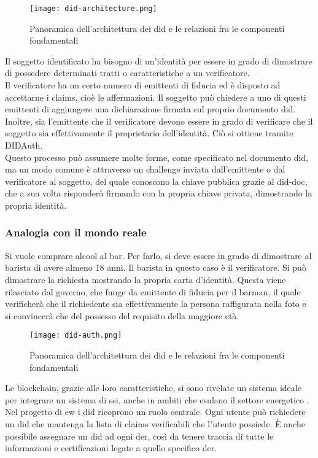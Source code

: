 \begin{figure}[ht]
    \texttt{[image: did-architecture.png]}
    \centering
    \caption{Panoramica dell'architettura dei \gls{did} e le relazioni fra le componenti fondamentali \cite{img:did-architecture}}
    \label{lab:did-architecture}
\end{figure}

Il soggetto identificato ha bisogno di un’identità per essere in grado di dimostrare di possedere determinati tratti o caratteristiche a un verificatore. \\
Il verificatore ha un certo numero di emittenti di fiducia ed è disposto ad accettarne i claims, cioè le affermazioni.
Il soggetto può chiedere a uno di questi emittenti di aggiungere una dichiarazione firmata sul proprio documento \gls{did}. 
Inoltre, sia l'emittente che il verificatore devono essere in grado di verificare che il soggetto sia effettivamente il proprietario dell'identità. 
Ciò si ottiene tramite DIDAuth. \\
Questo processo può assumere molte forme, come specificato nel documento \gls{did}, ma un modo comune è attraverso un challenge inviata dall'emittente o dal verificatore al soggetto, 
del quale conoscono la chiave pubblica grazie al \gls{did-doc}, che a sua volta risponderà firmando con la propria chiave privata, dimostrando la propria identità.

\subsubsection {Analogia con il mondo reale} 
Si vuole comprare alcool al bar. Per farlo, si deve essere in grado di dimostrare al barista di avere almeno 18 anni. Il barista in questo caso è il verificatore.
Si può dimostrare la richiesta mostrando la propria carta d'identità.
Questa viene rilasciato dal governo, che funge da emittente di fiducia per il barman, 
il quale verificherà che il richiedente sia effettivamente la persona raffigurata nella foto e si convincerà che del possesso del requisito della maggiore età.

\begin{figure}[ht]
    \texttt{[image: did-auth.png]}
    \centering
    \caption{Panoramica dell'architettura dei \gls{did} e le relazioni fra le componenti fondamentali \cite{img:did-auth}}
    \label{lab:did-auth}
\end{figure}

Le blockchain, grazie alle loro caratteristiche, si sono rivelate un sistema ideale per integrare un sistema di \gls{ssi}, anche in ambiti che esulano il settore energetico \cite{art:blockchain-did}. \\
Nel progetto di \gls{ew} i \gls{did} ricoprono un ruolo centrale. 
Ogni utente può richiedere un \gls{did} che mantenga la lista di claims verificabili che l'utente possiede.
È anche possibile assegnare un \gls{did} ad ogni \gls{der}, così da tenere traccia di tutte le informazioni e certificazioni legate a quello specifico \gls{der}. \\


